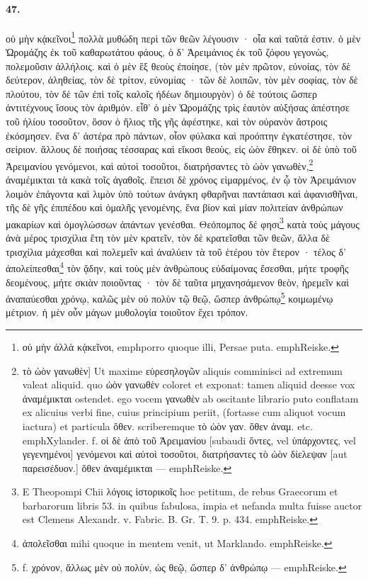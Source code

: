 \documentclass[a4paper, 11pt, oneside, polutonikogreek, german]{article}
\begin{document}
\paragraph{47.}
οὐ μὴν κᾀκεῖνοι\footnote{οὐ μὴν ἀλλὰ κᾀκεῖνοι, emph{porro quoque illi}, Persae puta. emph{Reiske.}} πολλὰ μυθώδη περὶ τῶν θεῶν λέγουσιν · οἷα καὶ ταῦτά ἐστιν. ὁ μὲν Ὡρομάζης ἐκ τοῦ καθαρωτάτου φάους, ὁ δ' Ἀρειμάνιος ἐκ τοῦ ζόφου γεγονὼς, πολεμοῦσιν ἀλλήλοις. καὶ ὁ μὲν ἓξ θεοὺς ἐποίησε, (τὸν μὲν πρῶτον, εὐνοίας, τὸν δὲ δεύτερον, ἀληθείας, τὸν δὲ τρίτον, εὐνομίας · τῶν δὲ λοιπῶν, τὸν μὲν σοφίας, τὸν δὲ πλούτου, τὸν δὲ τῶν ἐπὶ τοῖς καλοῖς ἡδέων δημιουργὸν) ὁ δὲ τούτοις ὥσπερ ἀντιτέχνους ἴσους τὸν ἀριθμόν. εἶθ' ὁ μὲν Ὡρομάζης τρὶς ἑαυτὸν αὐξήσας ἀπέστησε τοῦ ἡλίου τοσοῦτον, ὅσον ὁ ἥλιος τῆς γῆς ἀφέστηκε, καὶ τὸν οὐρανὸν ἄστροις ἐκόσμησεν. ἕνα δ' ἀστέρα πρὸ πάντων, οἷον φύλακα καὶ προόπτην ἐγκατέστησε, τὸν σείριον. ἄλλους δὲ ποιήσας τέσσαρας καὶ εἴκοσι θεοὺς, εἰς ὠὸν ἔθηκεν. οἱ δὲ ὑπὸ τοῦ Ἀρειμανίου γενόμενοι, καὶ αὐτοὶ τοσοῦτοι, διατρήσαντες τὸ ὠὸν γανωθὲν,\footnote{τὸ ὠὸν γανωθὲν] Ut maxime εὑρεσηλογῶν aliquis comminisci ad extremum valeat aliquid. quo ὠὸν γανωθὲν coloret et exponat: tamen aliquid deesse vox ἀναμέμικται ostendet. ego vocem γανωθὲν ab oscitante librario puto conflatam ex alicuius verbi fine, cuius principium periit, (fortasse cum aliquot vocum iactura) et particula ὅθεν. scriberemque τὸ ὠὸν γαν. ὅθεν ἀναμ. etc. emph{Xylander.} f. οἱ δὲ ἀπὸ τοῦ Ἀρειμανίου [subaudi ὄντες, vel ὑπάρχοντες, vel γεγενημένοι] γενόμενοι καὶ αὐτοὶ τοσοῦτοι, διατρήσαντες τὸ ὠὸν δίελεψαν [aut παρεισέδυον.] ὅθεν ἀναμέμικται --- emph{Reiske.}} ἀναμέμικται τὰ κακὰ τοῖς ἀγαθοῖς. ἔπεισι δὲ χρόνος εἱμαρμένος, ἐν ᾧ τὸν Ἀρειμάνιον λοιμὸν ἐπάγοντα καὶ λιμὸν ὑπὸ τούτων ἀνάγκη φθαρῆναι παντάπασι καὶ ἀφανισθῆναι, τῆς δὲ γῆς ἐπιπέδου καὶ ὁμαλῆς γενομένης, ἕνα βίον καὶ μίαν πολιτείαν ἀνθρώπων μακαρίων καὶ ὁμογλώσσων ἁπάντων γενέσθαι. Θεόπομπος δέ φησι\footnote{E Theopompi Chii λόγοις ἱστορικοῖς hoc petitum, de rebus Graecorum et barbarorum libris 53. in quibus fabulosa, impia et nefanda multa fuisse auctor est Clemens Alexandr. v. Fabric. B. Gr. T. 9. p. 434. emph{Reiske.}} κατὰ τοὺς μάγους ἀνὰ μέρος τρισχίλια ἔτη τὸν μὲν κρατεῖν, τὸν δὲ κρατεῖσθαι τῶν θεῶν, ἄλλα δὲ τρισχίλια μάχεσθαι καὶ πολεμεῖν καὶ ἀναλύειν τὰ τοῦ ἑτέρου τὸν ἕτερον · τέλος δ' ἀπολείπεσθαι\footnote{ἀπολεῖσθαι mihi quoque in mentem venit, ut Marklando. emph{Reiske.}} τὸν ᾅδην, καὶ τοὺς μὲν ἀνθρώπους εὐδαίμονας ἔσεσθαι, μήτε τροφῆς δεομένους, μήτε σκιὰν ποιοῦντας · τὸν δὲ ταῦτα μηχανησάμενον θεὸν, ἠρεμεῖν καὶ ἀναπαύεσθαι χρόνῳ, καλῶς μὲν οὐ πολὺν τῷ θεῷ, ὥσπερ ἀνθρώπῳ\footnote{f. χρόνον, ἄλλως μὲν οὐ πολὺν, ὡς θεῷ, ὥσπερ δ' ἀνθρώπῳ --- emph{Reiske.}} κοιμωμένῳ μέτριον. ἡ μὲν οὖν μάγων μυθολογία τοιοῦτον ἔχει τρόπον.
\end{document}

